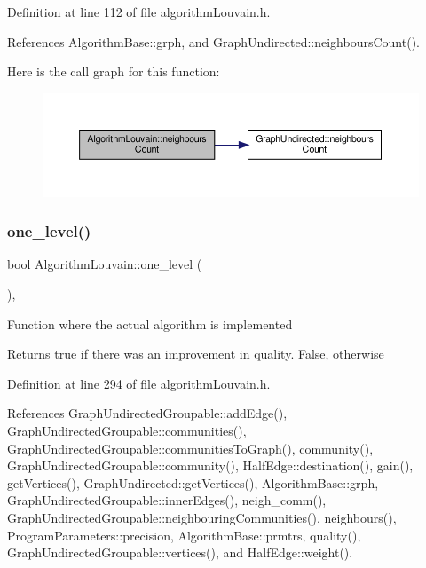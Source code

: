Definition at line 112 of file algorithm\+Louvain.\+h.



References Algorithm\+Base\+::grph, and Graph\+Undirected\+::neighbours\+Count().

Here is the call graph for this function\+:
\nopagebreak
\begin{figure}[H]
\begin{center}
\leavevmode
\includegraphics[width=350pt]{classAlgorithmLouvain_ae0355167afc6ba8296f213469f6da4b0_cgraph}
\end{center}
\end{figure}
\mbox{\label{classAlgorithmLouvain_a5370c76e777b7cbfddd1dccd865d9356}} 
\subsubsection{\texorpdfstring{one\+\_\+level()}{one\_level()}}
{\footnotesize\ttfamily bool Algorithm\+Louvain\+::one\+\_\+level (\begin{DoxyParamCaption}{ }\end{DoxyParamCaption})\hspace{0.3cm}{\ttfamily [inline]}, {\ttfamily [private]}}

Function where the actual algorithm is implemented

\begin{DoxyReturn}{Returns}
true if there was an improvement in quality. False, otherwise 
\end{DoxyReturn}


Definition at line 294 of file algorithm\+Louvain.\+h.



References Graph\+Undirected\+Groupable\+::add\+Edge(), Graph\+Undirected\+Groupable\+::communities(), Graph\+Undirected\+Groupable\+::communities\+To\+Graph(), community(), Graph\+Undirected\+Groupable\+::community(), Half\+Edge\+::destination(), gain(), get\+Vertices(), Graph\+Undirected\+::get\+Vertices(), Algorithm\+Base\+::grph, Graph\+Undirected\+Groupable\+::inner\+Edges(), neigh\+\_\+comm(), Graph\+Undirected\+Groupable\+::neighbouring\+Communities(), neighbours(), Program\+Parameters\+::precision, Algorithm\+Base\+::prmtrs, quality(), Graph\+Undirected\+Groupable\+::vertices(), and Half\+Edge\+::weight().




